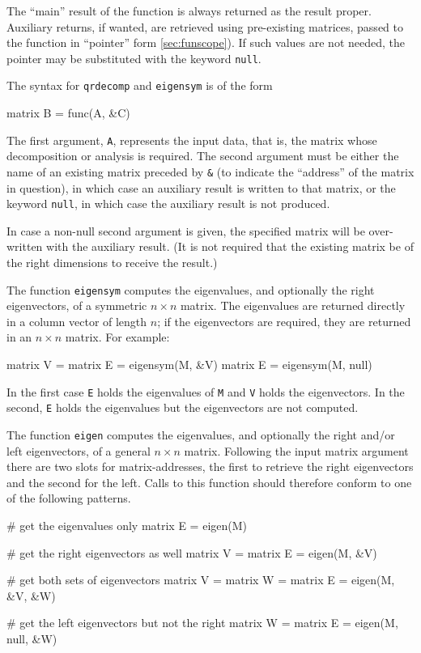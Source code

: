 The ``main'' result of the function is always returned as the result
proper. Auxiliary returns, if wanted, are retrieved using pre-existing
matrices, passed to the function in ``pointer'' form
\ref{sec:funscope}). If such values are not needed, the pointer may be
substituted with the keyword \texttt{null}.

The syntax for \texttt{qrdecomp} and \texttt{eigensym} is of the form
%
\begin{code}
matrix B = func(A, &C)
\end{code}
%
The first argument, \texttt{A}, represents the input data, that is,
the matrix whose decomposition or analysis is required.  The second
argument must be either the name of an existing matrix preceded by
\verb+&+ (to indicate the ``address'' of the matrix in question), in
which case an auxiliary result is written to that matrix, or the
keyword \texttt{null}, in which case the auxiliary result is not
produced.

In case a non-null second argument is given, the specified matrix will
be over-written with the auxiliary result.  (It is not required that
the existing matrix be of the right dimensions to receive the result.)

The function \texttt{eigensym} computes the eigenvalues, and
optionally the right eigenvectors, of a symmetric $n \times n$ matrix.
The eigenvalues are returned directly in a column vector of length
$n$; if the eigenvectors are required, they are returned in an $n
\times n$ matrix.  For example:
%
\begin{code}
matrix V = {}
matrix E = eigensym(M, &V)
matrix E = eigensym(M, null)
\end{code}
%
In the first case \texttt{E} holds the eigenvalues of \texttt{M} and
\texttt{V} holds the eigenvectors.  In the second, \texttt{E} holds
the eigenvalues but the eigenvectors are not computed.

The function \texttt{eigen} computes the eigenvalues, and optionally
the right and/or left eigenvectors, of a general $n \times n$
matrix. Following the input matrix argument there are two slots for
matrix-addresses, the first to retrieve the right eigenvectors and the
second for the left.  Calls to this function should therefore conform
to one of the following patterns.
\begin{code}
# get the eigenvalues only
matrix E = eigen(M)

# get the right eigenvectors as well
matrix V = {}
matrix E = eigen(M, &V)

# get both sets of eigenvectors
matrix V = {}
matrix W = {}
matrix E = eigen(M, &V, &W)

# get the left eigenvectors but not the right
matrix W = {}
matrix E = eigen(M, null, &W)
\end{code}


